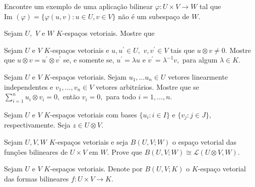 \documentclass[11pt,a4paper]{article}
\begin{document}
\begin{exercicio}
Encontre um exemplo de uma aplicação bilinear $\varphi \colon U \times V \to W$ tal que $\mbox{Im }(\varphi) = \{\varphi(u, v) \colon u \in U, v \in V\}$ não é um subespaço de $W.$
\end{exercicio}
\solucao{
}
\begin{exercicio} Sejam $U,$ $V$ e $W$ $K$-espaços vetoriais. Mostre que
\end{exercicio}
\solucao{}
\begin{exercicio}
Sejam $U$ e $V$ $K$-espaços vetoriais e $u, u^{\prime} \in U,$ $v, v^{\prime} \in V$ tais que $u \otimes v \neq 0.$ Mostre que $u \otimes v = u^{\prime} \otimes v^{\prime}$ se, e somente se, $u^{\prime} = \lambda u$ e $v^{\prime} = \lambda^{-1}v,$ para algum $\lambda \in K.$
\end{exercicio}
\solucao{}
\begin{exercicio}
Sejam $U$ e $V$ $K$-espaços vetoriais. Sejam $u_1, \ldots u_n \in U$ vetores linearmente independentes e $v_1, \ldots, v_n \in V$ vetores arbitrários. Mostre que se $\sum\limits_{i=1}^n u_i \otimes v_i = 0,$ então $v_i = 0,$ para todo $i = 1, \ldots, n.$
\end{exercicio}
\solucao{}
\begin{exercicio}
Sejam $U$ e $V$ $K$-espaços vetoriais com bases $\{u_i : i \in I\}$ e $\{v_j : j \in J\},$ respectivamente. Seja $z \in U \otimes V.$
\end{exercicio}
\solucao{}
\begin{exercicio}
Sejam $U, V, W$ $K$-espaços vetoriais e seja $B(U, V; W)$ o espaço vetorial das funções bilineares de $U \times V$ em $W.$ Prove que $B(U, V; W) \cong \mathcal{L}(U \otimes V, W).$
\end{exercicio}
\solucao{}
\begin{exercicio}
Sejam $U$ e $V$ $K$-espaços vetoriais. Denote por $B(U, V; K)$ o $K$-espaço vetorial das formas bilineares $f \colon U \times V \to K.$
\end{exercicio}
\end{document}
